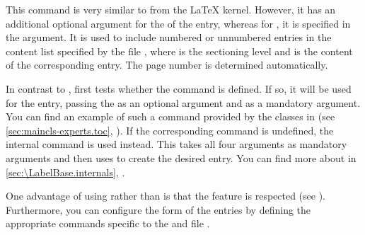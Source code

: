 \begin{Declaration}
\end{Declaration}
This command is very similar to
 from the \LaTeX{} kernel.
However, it has an additional optional argument for the 
of the entry, whereas for , it is specified in the
 argument. It is used to include numbered or unnumbered entries in
the content list specified by the file , where 
is the sectioning level and  is the content of the corresponding
entry. The page number is determined automatically.

In contrast to ,  first tests
whether the  command is defined.
If so, it will be used for the entry, passing the  as an
optional argument and  as a mandatory argument. You can find an
example of such a command provided by the \KOMAScript{} classes in
 (see
\autoref{sec:maincls-experts.toc},
). If the corresponding
command is undefined, the internal command
 is used instead. This takes
all four arguments as mandatory arguments and then uses
 to create the desired entry. You can find more about
 in
\autoref{sec:\LabelBase.internals},
.

One advantage of using  rather than
 is that the  feature is respected
(see ). Furthermore, you can configure
the form of the entries by defining the appropriate commands specific to the
 and file .%
%
\EndIndexGroup


